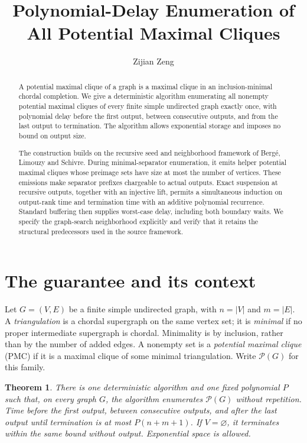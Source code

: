 \documentclass[acmsmall,12pt,screen,nonacm]{acmart}
\title{Polynomial-Delay Enumeration of All Potential Maximal Cliques}
\author{Zijian Zeng}
\affiliation{\institution{UCSI University}\city{Kuala Lumpur}\country{Malaysia}}
\date{}
\newtheorem{theorem}{Theorem}[section]
\newcommand{\PMC}{\mathcal P}
\begin{document}
\begin{abstract}
A potential maximal clique of a graph is a maximal clique in an
inclusion-minimal chordal completion. We give a deterministic algorithm
enumerating all nonempty potential maximal cliques of every finite simple
undirected graph exactly once, with polynomial delay before the first output,
between consecutive outputs, and from the last output to termination.
The algorithm allows exponential storage and imposes no bound on output size.

The construction builds on the recursive seed and neighborhood framework of
Berg\'e, Limouzy and Schivre. During minimal-separator enumeration, it emits
helper potential maximal cliques whose preimage sets have size at most the
number of vertices. These emissions make separator prefixes chargeable to
actual outputs. Exact suspension at recursive outputs, together with an
injective lift, permits a simultaneous induction on output-rank time and
termination time with an additive polynomial recurrence. Standard buffering
then supplies worst-case delay, including both boundary waits. We specify
the graph-search neighborhood explicitly and verify that it retains the
structural predecessors used in the source framework.
\end{abstract}
\maketitle
\clearpage

\section{The guarantee and its context}

Let $G=(V,E)$ be a finite simple undirected graph, with $n=|V|$ and $m=|E|$.
A \emph{triangulation} is a chordal supergraph on the same vertex set;
it is \emph{minimal} if no proper intermediate supergraph is chordal.
Minimality is by inclusion, rather than by the number of added edges.
A nonempty set is a \emph{potential maximal clique} (PMC) if it is a maximal
clique of some minimal triangulation. Write $\PMC(G)$ for this family.

\begin{theorem}\label{thm:main}
There is one deterministic algorithm and one fixed polynomial $P$ such that,
on every graph $G$, the algorithm enumerates $\PMC(G)$ without repetition.
Time before the first output, between consecutive outputs, and after the
last output until termination is at most $P(n+m+1)$. If $V=\varnothing$,
it terminates within the same bound without output. Exponential space is allowed.
\end{theorem}
\end{document}
